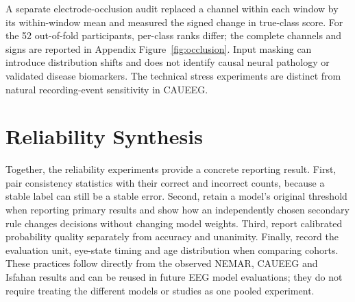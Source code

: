 A separate electrode-occlusion audit replaced a channel within each window by its within-window mean and measured the signed change in true-class score. For the 52 out-of-fold participants, per-class ranks differ; the complete channels and signs are reported in Appendix Figure~\ref{fig:occlusion}. Input masking can introduce distribution shifts and does not identify causal neural pathology or validated disease biomarkers. The technical stress experiments are distinct from natural recording-event sensitivity in CAUEEG.

\section{Reliability Synthesis}
Together, the reliability experiments provide a concrete reporting result. First, pair consistency statistics with their correct and incorrect counts, because a stable label can still be a stable error. Second, retain a model's original threshold when reporting primary results and show how an independently chosen secondary rule changes decisions without changing model weights. Third, report calibrated probability quality separately from accuracy and unanimity. Finally, record the evaluation unit, eye-state timing and age distribution when comparing cohorts. These practices follow directly from the observed NEMAR, CAUEEG and Isfahan results and can be reused in future EEG model evaluations; they do not require treating the different models or studies as one pooled experiment.
